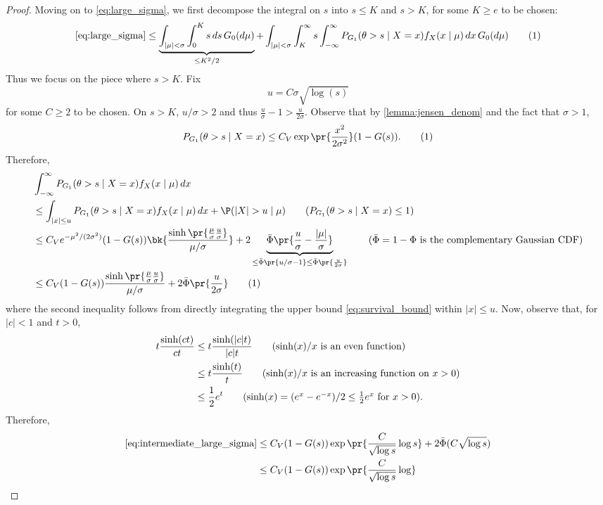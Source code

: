 \documentclass[12pt, reqno]{amsart}
\newcommand\numberthis{\addtocounter{equation}{1}\tag{\theequation}}
\numberwithin{equation}{section}
\begin{document}
\begin{refsection}
\begin{appendices}
\begin{proof}
Moving on to \eqref{eq:large_sigma}, we first decompose the integral on $s$ into $s \le K$
and $s > K$, for some $K \ge e$ to be chosen: \[
\eqref{eq:large_sigma} \le \underbrace{\int_{|\mu| < \sigma} \int_0^K s \,ds \,G_0(d\mu)}_
{\le K^{2}/2} + \int_
{|\mu| < \sigma} \int_K^\infty s \int_{-\infty}^\infty P_{G_1}(\theta > s \mid X=x) f_X
(x\mid \mu) \,dx\,G_0(d\mu) \numberthis \label{eq:large_sigma_bound}
\] Thus we focus on the piece where $s > K$. Fix \[u = C \sigma \sqrt{\log (s)}\] for some
 $C
\ge 2$ to be chosen. On $s > K$,
$u/\sigma > 2$ and thus $\frac{u}{\sigma} - 1 > \frac{u}{2\sigma}$.
Observe that by \cref{lemma:jensen_denom} and the fact that $\sigma > 1$, \[
P_{G_1}(\theta > s \mid X=x) \le C_V \exp\pr{\frac{x^2}{2\sigma^2}} (1-G(s)). \numberthis
\label{eq:survival_bound}
\]
Therefore, \begin{align*}
&\int_{-\infty}^\infty P_{G_1}(\theta > s \mid X=x) f_X
(x\mid \mu)\,dx \\
&\le \int_{|x| \le u} P_{G_1}(\theta > s \mid X=x) f_X
(x\mid \mu)\,dx + \P(|X|>u \mid \mu) \tag{$P_{G_1}(\theta > s \mid X=x) \le 1$}\\
&\le C_V e^{-\mu^2/(2\sigma^2)}(1-G(s)) \bk{
  \frac{\sinh\pr{\frac{\mu}{\sigma} \frac{u}{\sigma}}}{\mu/\sigma}
} + 2\underbrace{\bar\Phi\pr{\frac{u}{\sigma} - \frac{|\mu|}{\sigma}}}_{\le \bar\Phi
\pr{u/\sigma - 1} \le \bar\Phi\pr{\frac{u}{2 \sigma}}} \tag{$\bar\Phi = 1-\Phi$ is the
complementary Gaussian CDF}\\
&\le C_V(1-G(s)) \frac{\sinh\pr{\frac{\mu}{\sigma} \frac{u}{\sigma}}}{\mu/\sigma} +
2\bar\Phi\pr{\frac{u}{2 \sigma}} \numberthis \label{eq:intermediate_large_sigma}
\end{align*}
where the second inequality follows from directly integrating the upper bound 
\eqref{eq:survival_bound} within $|x| \le u$. Now, observe that, for $|c| < 1$ and $t >
0$, \begin{align*}
t \frac{\sinh(ct)}{ct} &\le t \frac{\sinh(|c|t)}{|c|t} \tag{$\sinh(x)/x$ is an even
function}  \\
&\le t \frac{\sinh(t)}{t} \tag{$\sinh(x)/x$ is an increasing function on $x > 0$} \\
&\le \frac{1}{2}e^{t} \tag{$\sinh(x) = (e^x-e^{-x})/2\le \frac{1}{2}e^x$ for $x > 0$}.
\end{align*}
Therefore, \begin{align*}
\eqref{eq:intermediate_large_sigma} &\le C_V (1-G(s)) \exp\pr{\frac{C}{\sqrt{\log s}} \log
s} + 2 \bar\Phi
(C \sqrt{\log s}) \\
&\le C_V (1-G(s)) \exp\pr{\frac{C}{\sqrt{\log s}} \log
}
\end{align*}
\end{proof}
\end{appendices}
\end{refsection}
\end{document}
